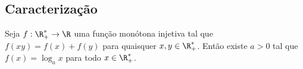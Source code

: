 \subsection{Caracterização}

\begin{theorem}
Seja $f:  \R_+^* \to \R$ uma função monótona injetiva tal que
$f(xy) = f(x) + f(y)$ para quaisquer $x, y \in \R_+^*$. Então
existe $a>0$ tal que $f(x) = \log_a x$ para todo $x \in \R_+^*$.
\end{theorem}